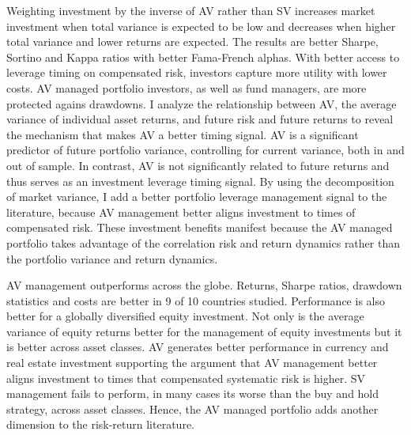 Weighting investment by the inverse of AV rather than SV increases market investment when total variance is expected to be low and decreases when higher total variance and lower returns are expected. The results are better Sharpe, Sortino and Kappa ratios with better Fama-French alphas. With better access to leverage timing on compensated risk, investors capture more utility with lower costs. AV managed portfolio investors, as well as fund managers, are more protected agains drawdowns. I analyze the relationship between AV, the average variance of individual asset returns, and future risk and future returns to reveal the mechanism that makes AV a better timing signal. AV is a significant predictor of future portfolio variance, controlling for current variance, both in and out of sample. In contrast, AV is not significantly related to future returns and thus serves as an investment leverage timing signal. By using the decomposition of market variance, I add a better portfolio leverage management signal to the literature, because AV management better aligns investment to times of compensated risk. These investment benefits manifest because the AV managed portfolio takes advantage of the correlation risk and return dynamics rather than the portfolio variance and return dynamics.

AV management outperforms across the globe. Returns, Sharpe ratios, drawdown statistics and costs are better in 9 of 10 countries studied. Performance is also better for a globally diversified equity investment. Not only is the average variance of equity returns better for the management of equity investments but it is better across asset classes. AV generates better performance in currency and real estate investment supporting the argument that AV management better aligns investment to times that compensated systematic risk is higher. SV management fails to perform, in many cases its worse than the buy and hold strategy, across asset classes. Hence, the AV managed portfolio adds another dimension to the risk-return literature.

